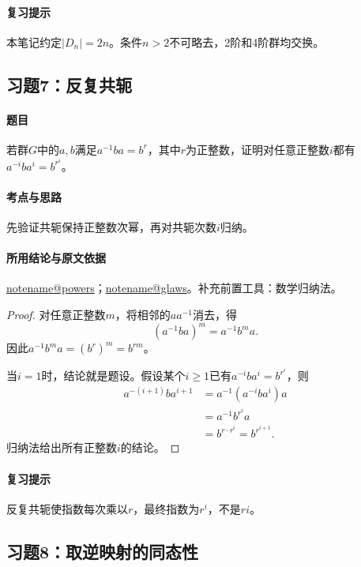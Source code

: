 \documentclass[UTF8,a4paper,11pt,fontset=windows]{ctexart}
\makeatletter
\newcommand{\noteref}[1]{\hyperref[note:#1]{\csname notename@#1\endcsname}}
\newcommand{\exref}[2]{\hyperref[ex:#1:#2]{第#1章习题#2}}
\makeatother
\begin{document}
\paragraph{复习提示}
本笔记约定$|D_n|=2n$。条件$n>2$不可略去，2阶和4阶群均交换。


\subsection{习题7：\texorpdfstring{反复共轭}{反复共轭}}
\label{ex:1:7}

\paragraph{题目}
若群$G$中的$a,b$满足$a^{-1}ba=b^r$，其中$r$为正整数，证明对任意正整数$i$都有$a^{-i}ba^i=b^{r^i}$。

\paragraph{考点与思路}
先验证共轭保持正整数次幂，再对共轭次数$i$归纳。

\paragraph{所用结论与原文依据}
\noteref{powers}；\noteref{glaws}。补充前置工具：数学归纳法。


\begin{proof}
对任意正整数$m$，将相邻的$aa^{-1}$消去，得
\[
(a^{-1}ba)^m=a^{-1}b^ma.
\]
因此$a^{-1}b^ma=(b^r)^m=b^{rm}$。

当$i=1$时，结论就是题设。假设某个$i\geq1$已有$a^{-i}ba^i=b^{r^i}$，则
\begin{align*}
a^{-(i+1)}ba^{i+1}
&=a^{-1}(a^{-i}ba^i)a\\
&=a^{-1}b^{r^i}a\\
&=b^{r\cdot r^i}=b^{r^{i+1}}.
\end{align*}
归纳法给出所有正整数$i$的结论。
\end{proof}

\paragraph{复习提示}
反复共轭使指数每次乘以$r$，最终指数为$r^i$，不是$ri$。


\subsection{习题8：\texorpdfstring{取逆映射的同态性}{取逆映射的同态性}}
\label{ex:1:8}
\end{document}
